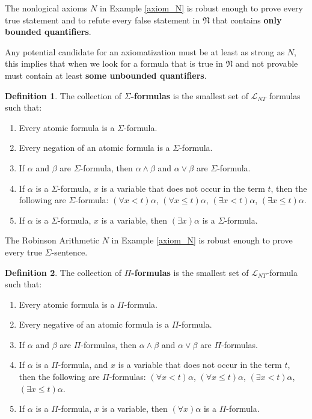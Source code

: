 \documentclass[11pt,letterpaper]{book}
\theoremstyle{definition}
\newtheorem{definition}{Definition}[section]
\begin{document}
The nonlogical axioms $N$ in Example \ref{axiom_N} is robust enough to prove every
true statement and to refute every false statement in $\mathfrak{N}$
that contains \textbf{only bounded quantifiers}.

Any potential candidate for an axiomatization must be at least as strong
as $N$, this implies that when we look for a formula that is true in
$\mathfrak{N}$ and not provable must contain at least \textbf{some unbounded
quantifiers}.




\begin{definition}\label{def:Sigma_formulas}
The collection of \textbf{$\Sigma$-formulas} is the smallest set of
$\mathcal{L}_{NT}$ formulas such that:
\begin{enumerate}
\item{Every atomic formula is a $\Sigma$-formula.}
\item{Every negation of an atomic formula is a $\Sigma$-formula.}
\item{If $\alpha$ and $\beta$ are $\Sigma$-formula, then $\alpha \land
\beta$ and $\alpha \lor \beta$ are $\Sigma$-formula.}
\item{If $\alpha$ is a $\Sigma$-formula, $x$ is a variable that does not
occur in the term $t$, then the following are $\Sigma$-formula:
$(\forall x < t ) \alpha $, $ (\forall x \leq t ) \alpha $, $ (\exists x
< t) \alpha $, $ (\exists x \leq t) \alpha $. }
\item{If $\alpha$ is a $\Sigma$-formula, $x$ is a variable, then {\color{red}
$(\exists x) \alpha$} is a $\Sigma$-formula. }
\end{enumerate}
\end{definition}


The Robinson Arithmetic $N$ in Example \ref{axiom_N} is robust enough to prove every true
$\Sigma$-sentence.


\begin{definition}\label{def:Pi_formulas}
The collection of \textbf{$\Pi $-formulas} is the smallest set of
$\mathcal{L}_{NT}$-formula such that:
\begin{enumerate}
\item{Every atomic formula is a $\Pi $-formula.}
\item{Every negative of an atomic formula is a $\Pi $-formula.}
\item{If $\alpha $ and $\beta$ are $\Pi $-formulas, then $\alpha \land
\beta$ and $\alpha \lor \beta$ are $\Pi $-formulas.}
\item{If $\alpha$ is a $\Pi $-formula, and $x$ is a variable that does
not occur in the term $t$, then the following are $\Pi $-formulas:
$(\forall x < t ) \alpha $, $ (\forall x \leq t ) \alpha $, $ (\exists x
< t) \alpha $, $ (\exists x \leq t) \alpha $. }
\item{If $\alpha$ is a $\Pi $-formula, $x$ is a variable, then {\color{red}$(\forall
x ) \alpha$} is a $\Pi $-formula.}
\end{enumerate}
\end{definition}
\end{document}
